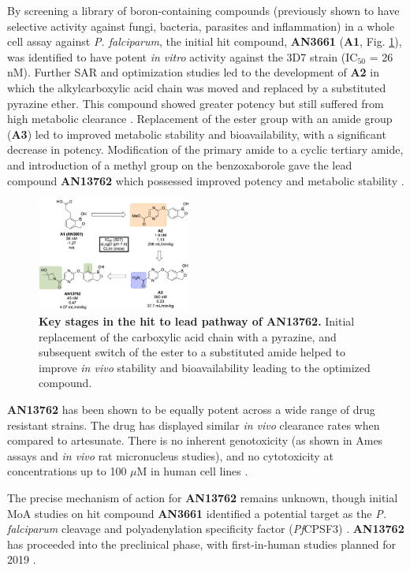 \documentclass[twocolumn]{bmcart}%
\begin{document}
By screening a library of boron-containing compounds (previously shown to have selective activity against fungi, bacteria, parasites and inflammation) in a whole cell assay against \textit{P. falciparum}, the initial hit compound, \textbf{AN3661} (\textbf{A1}, Fig. \ref{Figure13}), was identified to have potent \textit{in vitro} activity against the 3D7 strain (IC$_{50}$ = 26 nM). Further SAR and optimization studies led to the development of \textbf{A2} in which the alkylcarboxylic acid chain was moved and replaced by a substituted pyrazine ether. This compound showed greater potency but still suffered from high metabolic clearance \cite{Zhang2015}. Replacement of the ester group with an amide group (\textbf{A3}) led to improved metabolic stability and bioavailability, with a significant decrease in potency. Modification of the primary amide to a cyclic tertiary amide, and introduction of a methyl group on the benzoxaborole gave the lead compound \textbf{AN13762} which possessed improved potency and metabolic stability \cite{Zhang2017}.

\begin{figure}[h]
	\includegraphics [width=0.45\textwidth] {Figure13}
	\caption{{\bf Key stages in the hit to lead pathway of AN13762.} Initial replacement of the carboxylic acid chain with a pyrazine, and subsequent switch of the ester to a substituted amide helped to improve \textit{in vivo} stability and bioavailability leading to the optimized compound.}
	\label{Figure13}
\end{figure}

\textbf{AN13762} has been shown to be equally potent across a wide range of drug resistant strains. The drug has displayed similar \textit{in vivo} clearance rates when compared to artesunate.  There is no inherent genotoxicity (as shown in Ames assays and \textit{in vivo} rat micronucleus studies), and no cytotoxicity at concentrations up to 100 $\mu$M in human cell lines \cite{Zhang2017}.

The precise mechanism of action for \textbf{AN13762} remains unknown, though initial MoA studies on hit compound \textbf{AN3661} identified a potential target as the \textit{P. falciparum} cleavage and polyadenylation specificity factor (\textit{Pf}CPSF3) \cite{Sonoiki2017}. \textbf{AN13762} has proceeded into the preclinical phase, with first-in-human studies planned for 2019 \cite{MMV}.
\end{document}
